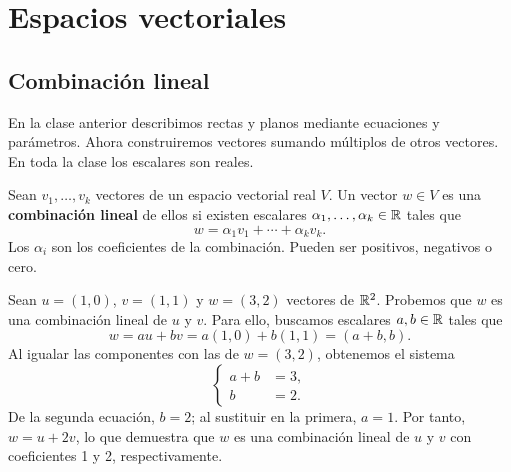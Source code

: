 \documentclass[compacto,10pt]{pubciencias-notas}
\begin{document}
\encabezado
\vspace*{-8mm}
\setcounter{section}{3}
\section{Espacios vectoriales}
\subsection{Combinación lineal}

En la clase anterior describimos rectas y planos mediante ecuaciones y
parámetros. Ahora construiremos vectores sumando múltiplos de otros
vectores. En toda la clase los escalares son reales.

\begin{defi}\label{sem07cl02:combinacion}
    Sean $v_1,\ldots,v_k$ vectores de un espacio vectorial real $V$.
    Un vector $w\in V$ es una \textbf{combinación lineal} de ellos si
    existen escalares $\alpha_1,\ldots,\alpha_k\in\mathbb{R}$ tales que
    \[
        w=\alpha_1v_1+\cdots+\alpha_kv_k.
    \]
    Los $\alpha_i$ son los coeficientes de la combinación. Pueden ser
    positivos, negativos o cero.
\end{defi}

\begin{ejem}
    Sean $u=(1,0)$, $v=(1,1)$ y $w=(3,2)$ vectores de $\mathbb{R}^2$.
    Probemos que $w$ es una combinación lineal de $u$ y $v$.
    Para ello, buscamos escalares $a,b\in\mathbb{R}$ tales que
    \[
        w=au+bv=a(1,0)+b(1,1)=(a+b,b).
    \]
    Al igualar las componentes con las de $w=(3,2)$, obtenemos el sistema
    \[
        \left\{\begin{aligned}a+b&=3,\\b&=2.\end{aligned}\right.
    \]
    De la segunda ecuación, $b=2$; al sustituir en la primera, $a=1$.
    Por tanto, $w=u+2v$, lo que demuestra que $w$ es una combinación
    lineal de $u$ y $v$ con coeficientes 1 y 2, respectivamente.
\end{ejem}
\begin{center}
\end{center}
\end{document}
